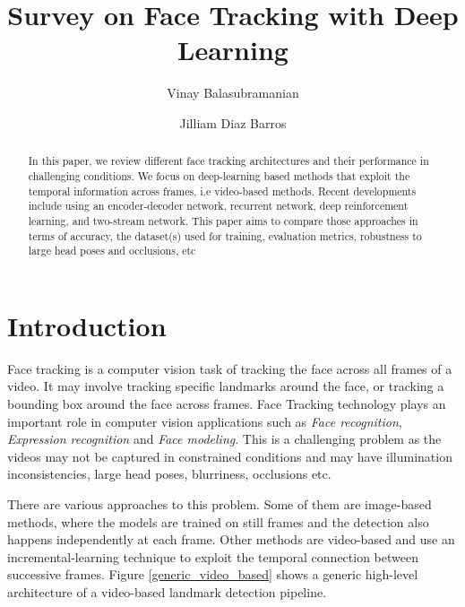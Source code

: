 \documentclass{llncs}
\begin{document}
\pagestyle{headings}  %

%
\title{Survey on Face Tracking with Deep Learning}
%
%
\author{Vinay Balasubramanian \and Jilliam Diaz Barros}
%
%

\maketitle              %

\begin{abstract}
In this paper, we review different face tracking architectures and their performance in challenging conditions. We focus on deep-learning based methods that exploit the temporal information across frames, i.e video-based methods. Recent developments include using an encoder-decoder network, recurrent network, deep reinforcement learning, and two-stream network. This paper aims to compare those approaches in terms of accuracy, the dataset(s) used for training, evaluation metrics, robustness to large head poses and occlusions, etc
\end{abstract}


\section{Introduction}
Face tracking is a computer vision task of tracking the face across all frames of a video. It may involve tracking specific landmarks around the face, or tracking a bounding box around the face across frames.
Face Tracking technology plays an important role in computer vision applications such as \textit{Face recognition}\cite{face_recognition}, \textit{Expression recognition}\cite{expression_recognition} and \textit{Face modeling}\cite{face_modeling}. This is a challenging problem as the videos may not be captured in constrained conditions and may have illumination inconsistencies, large head poses, blurriness, occlusions etc.

There are various approaches to this problem. Some of them are image-based methods, where the models are trained on still frames and the detection also happens independently at each frame. Other methods are video-based and use an incremental-learning technique to exploit the temporal connection between successive frames. Figure \ref{generic_video_based} shows a generic high-level architecture of a video-based landmark detection pipeline.
\end{document}
